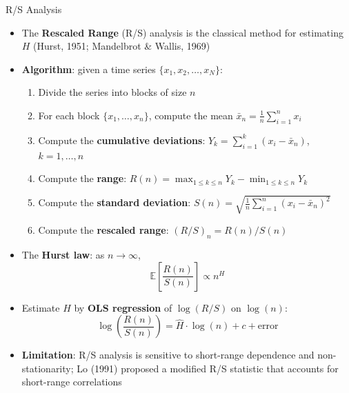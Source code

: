 \documentclass[9pt, aspectratio=169, t]{beamer}
\theoremstyle{definition}
\newcommand{\E}{\mathbb{E}}
\begin{document}
\begin{frame}{R/S Analysis}
    \begin{itemize}
        \item The \textbf{Rescaled Range} (R/S) analysis is the classical method for estimating $H$ (Hurst, 1951; Mandelbrot \& Wallis, 1969)
        \item \textbf{Algorithm}: given a time series $\{x_1, x_2, \ldots, x_N\}$:
        \begin{enumerate}
            \item Divide the series into blocks of size $n$
            \item For each block $\{x_1, \ldots, x_n\}$, compute the mean $\bar{x}_n = \frac{1}{n}\sum_{i=1}^n x_i$
            \item Compute the \textbf{cumulative deviations}: $Y_k = \sum_{i=1}^k (x_i - \bar{x}_n)$, \quad $k = 1, \ldots, n$
            \item Compute the \textbf{range}: $R(n) = \max_{1 \leq k \leq n} Y_k - \min_{1 \leq k \leq n} Y_k$
            \item Compute the \textbf{standard deviation}: $S(n) = \sqrt{\frac{1}{n}\sum_{i=1}^n (x_i - \bar{x}_n)^2}$
            \item Compute the \textbf{rescaled range}: $(R/S)_n = R(n) / S(n)$
        \end{enumerate}
        \item The \textbf{Hurst law}: as $n \to \infty$,
        \[
            \E\!\left[\frac{R(n)}{S(n)}\right] \propto n^H
        \]
        \item Estimate $H$ by \textbf{OLS regression} of $\log(R/S)$ on $\log(n)$:
        \[
            \log\!\left(\frac{R(n)}{S(n)}\right) = \hat{H} \cdot \log(n) + c + \text{error}
        \]
        \item \textbf{Limitation}: R/S analysis is sensitive to short-range dependence and non-stationarity; Lo (1991) proposed a modified R/S statistic that accounts for short-range correlations
    \end{itemize}
\end{frame}
\end{document}
